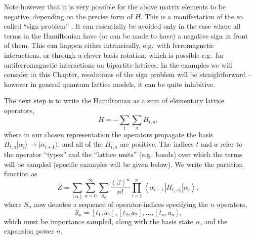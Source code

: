 \documentclass[vecphys]{svmult}
\begin{document}
Note however that it is very possible for the above matrix elements to be negative, depending on the precise form of $H$.
This is a manifestation of the so called ``sign problem'' \cite{Melko:Henelius00}.  It can 
essentially be avoided only in the case where all terms in the Hamiltonian have (or can be made to have) a negative sign in front of them. 
This can happen either intrinsically, e.g.~with ferromagnetic interactions, or through a clever basis rotation, which is possible e.g.~for antiferromagnetic interactions on bipartite lattices.  In the examples we will consider in this Chapter, resolutions of the sign problem will be straightforward -- however in general quantum lattice models, it can be quite inhibitive.

The next step is to write the Hamiltonian as a sum of elementary lattice operators,
\begin{equation}
H=-\sum_t \sum_a H_{t,a}, \label{Hdecomp}
\label{Hsum}
\end{equation}
where in our chosen representation the operators propagate the basis $H_{t,a} |\alpha_i \rangle \rightarrow | \alpha_{i+1} \rangle$, and all of the $H_{t,a}$ are positive.  The indices $t$ and $a$ refer to the operator ``types'' and the ``lattice units'' (e.g.~bonds) over which the terms will be sampled (specific examples will be given below).  We write the partition function as 
\begin{equation}
Z=\sum_{ \{ \alpha_i \} } \sum_{n=0}^{\infty} \sum_{S_n} \frac{ (\beta)^n}{n !}
 \prod_{i=1}^{n}  \left\langle{\alpha_{i-1}  \left|  {H_{t_i,a_i}}  \right| \alpha_i   }\right\rangle,
 \label{Zsse2b}
\end{equation}
where $S_n$ now denotes a sequence of operator-indices specifying the $n$ operators,
\begin{equation}
S_n = [t_1,a_1],[t_2,a_2], \ldots ,[t_n,a_n],
\end{equation}
which must be importance sampled, along with the basis state $\alpha$, and the expansion power $n$.   
\end{document}
